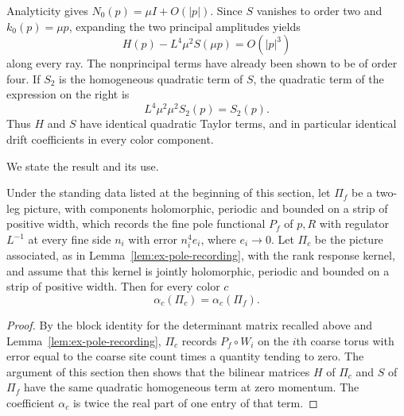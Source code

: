Analyticity gives $N_0(p)=\mu I+O(|p|)$. Since $S$ vanishes
to order two and $k_0(p)=\mu p$, expanding the two principal
amplitudes yields
\[
             H(p)-L^4\mu^2S(\mu p)=O(|p|^3)
\]
along every ray. The nonprincipal terms have already been shown
to be of order four. If $S_2$ is the homogeneous quadratic term
of $S$, the quadratic term of the expression on the right is
\[
                        L^4\mu^2\mu^2S_2(p)=S_2(p).
\]
Thus $H$ and $S$ have identical quadratic Taylor terms, and in
particular identical drift coefficients in every color component.

We state the result and its use.

\begin{proposition}
\label{prop:ex-pole-coefficient-transport}
Under the standing data listed at the beginning of this section, let
$\Pi_f$ be a two-leg picture, with components holomorphic, periodic and
bounded on a strip of positive width, which records the fine pole
functional $P_f$ of $p,R$ with regulator $L^{-1}$ at every fine side
$n_i$ with error $n_i^4e_i$, where $e_i\to0$. Let $\Pi_c$ be the
picture associated, as in Lemma~\ref{lem:ex-pole-recording}, with the
rank response kernel, and assume that this kernel is jointly
holomorphic, periodic and bounded on a strip of positive width. Then
for every color $c$
\[
 \alpha_c(\Pi_c)=\alpha_c(\Pi_f).
\]
\end{proposition}
\begin{proof}
By the block identity for the determinant matrix recalled above and
Lemma~\ref{lem:ex-pole-recording}, $\Pi_c$ records $P_f\circ W_i$ on
the $i$th coarse torus with error equal to the coarse site count times
a quantity tending to zero. The argument of this section then shows
that the bilinear matrices $H$ of $\Pi_c$ and $S$ of $\Pi_f$ have the
same quadratic homogeneous term at zero momentum. The coefficient
$\alpha_c$ is twice the real part of one entry of that term.
\end{proof}

